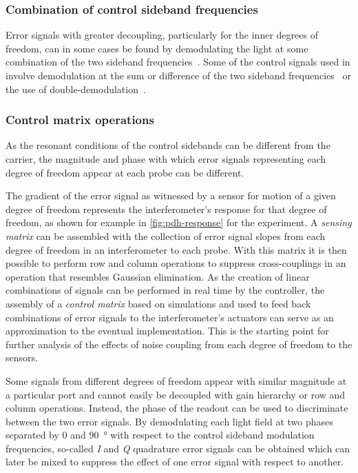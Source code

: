 \subsubsection{\label{sec:sideband-beats}Combination of control sideband frequencies}
Error signals with greater decoupling, particularly for the inner degrees of freedom, can in some cases be found by demodulating the light at some combination of the two sideband frequencies~\cite{Strain2003, Barr2006}. Some of the control signals used in \ALIGO{} involve demodulation at the sum or difference of the two sideband frequencies~\cite{Abbott2010} or the use of double-demodulation~\cite{Staley2014}.

\subsubsection{\label{sec:control-matrix-operations}Control matrix operations}
As the resonant conditions of the control sidebands can be different from the carrier, the magnitude and phase with which error signals representing each degree of freedom appear at each probe can be different.

The gradient of the error signal as witnessed by a sensor for motion of a given degree of freedom represents the interferometer's response for that degree of freedom, as shown for example in \cref{fig:pdh-response} for the \SSM{} experiment. A \emph{sensing matrix} can be assembled with the collection of error signal slopes from each degree of freedom in an interferometer to each probe. With this matrix it is then possible to perform row and column operations to suppress cross-couplings in an operation that resembles Gaussian elimination. As the creation of linear combinations of signals can be performed in real time by the controller, the assembly of a \emph{control matrix} based on simulations and used to feed back combinations of error signals to the interferometer's actuators can serve as an approximation to the eventual implementation. This is the starting point for further analysis of the effects of noise coupling from each degree of freedom to the sensors.

Some signals from different degrees of freedom appear with similar magnitude at a particular port and cannot easily be decoupled with gain hierarchy or row and column operations. Instead, the phase of the readout can be used to discriminate between the two error signals. By demodulating each light field at two phases separated by \num{0} and \SI{90}{\degree} with respect to the control sideband modulation frequencies, so-called \emph{I} and \emph{Q} quadrature error signals can be obtained which can later be mixed to suppress the effect of one error signal with respect to another.

